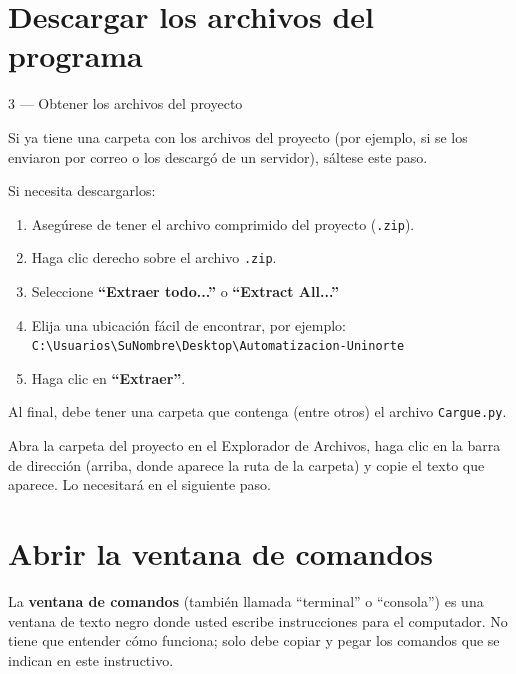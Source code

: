 \documentclass[12pt, letterpaper]{article}
\begin{document}
\section{Descargar los archivos del programa}

\begin{paso}{3 — Obtener los archivos del proyecto}

  Si ya tiene una carpeta con los archivos del proyecto (por ejemplo, si se los enviaron por correo o los descargó de un servidor), sáltese este paso.

  Si necesita descargarlos:
  \begin{enumerate}[leftmargin=0.5cm, label=\textcolor{uninorteazul}{\arabic*.}]
    \item Asegúrese de tener el archivo comprimido del proyecto (\texttt{.zip}).
    \item Haga clic derecho sobre el archivo \texttt{.zip}.
    \item Seleccione \textbf{``Extraer todo...''} o \textbf{``Extract All...''}
    \item Elija una ubicación fácil de encontrar, por ejemplo:\\
          \texttt{C:\textbackslash{}Usuarios\textbackslash{}SuNombre\textbackslash{}Desktop\textbackslash{}Automatizacion-Uninorte}
    \item Haga clic en \textbf{``Extraer''}.
  \end{enumerate}

  Al final, debe tener una carpeta que contenga (entre otros) el archivo \texttt{Cargue.py}.
\end{paso}

\begin{info}
  Abra la carpeta del proyecto en el Explorador de Archivos, haga clic en la barra de dirección (arriba, donde aparece la ruta de la carpeta) y copie el texto que aparece. Lo necesitará en el siguiente paso.
\end{info}

\section{Abrir la ventana de comandos}

La \textbf{ventana de comandos} (también llamada ``terminal'' o ``consola'') es una ventana de texto negro donde usted escribe instrucciones para el computador. No tiene que entender cómo funciona; solo debe copiar y pegar los comandos que se indican en este instructivo.
\end{document}
